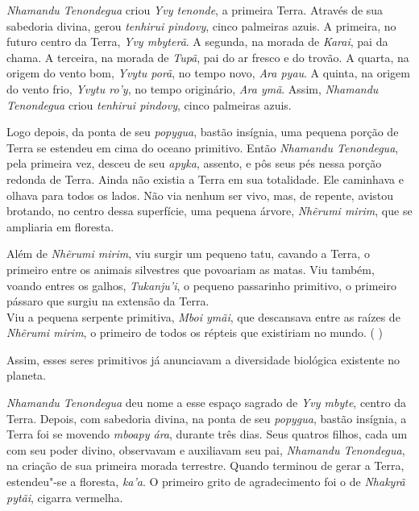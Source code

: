 

 

 



\emph{Nhamandu Tenondegua} criou \emph{Yvy tenonde}, a primeira Terra.
Através de sua sabedoria divina, gerou \emph{tenhirui pindovy}, cinco
palmeiras azuis. A primeira, no futuro centro da Terra, \emph{Yvy
mbyterã}. A segunda, na morada de \emph{Karai}, pai da chama. A terceira, na morada de \emph{Tupã}, pai do ar fresco e do trovão. A quarta, na origem do vento bom, \emph{Yvytu porã}, no tempo novo,
\emph{Ara pyau}. A quinta, na origem do vento frio, \emph{Yvytu ro'y},
no tempo originário, \emph{Ara ymã}. Assim, \emph{Nhamandu Tenondegua}
criou \emph{tenhirui pindovy}, cinco palmeiras azuis{.}

Logo depois, da ponta de seu \emph{popygua}, bastão insígnia, uma
pequena porção de Terra se estendeu em cima do oceano primitivo. Então
\emph{Nhamandu Tenondegua}, pela primeira vez, desceu de seu
\emph{apyka}, assento, e pôs seus pés nessa porção redonda de Terra.
Ainda não existia a Terra em sua totalidade. Ele caminhava e olhava para
todos os lados. Não via nenhum ser vivo, mas, de repente, avistou
brotando, no centro dessa superfície, uma pequena árvore, \emph{Nhẽrumi
mirim}, que se ampliaria em floresta.




Além de \emph{Nhẽrumi mirim}, viu surgir um pequeno tatu, cavando a
Terra, o primeiro entre os animais silvestres que povoariam as matas.
Viu também, voando entres os galhos, \emph{Tukanju'i}, o pequeno
passarinho primitivo, o primeiro pássaro que surgiu na extensão da
Terra.\\ Viu a pequena serpente primitiva, \emph{Mboi ymãi}, que
descansava entre as raízes de \emph{Nhẽrumi mirim}, o primeiro de todos
os répteis que existiriam no mundo. %
( )

 

Assim, esses seres primitivos já anunciavam a diversidade biológica
existente no planeta.



\emph{Nhamandu Tenondegua} deu nome a esse espaço sagrado de \emph{Yvy
mbyte}, centro da Terra. Depois, com sabedoria divina, na ponta de seu
\emph{popygua}, bastão insígnia, a Terra foi se movendo \emph{mboapy
ára}, durante três dias. Seus quatros filhos, cada um com seu poder
divino, observavam e auxiliavam seu pai, \emph{Nhamandu Tenondegua}, na
criação de sua primeira morada terrestre. Quando terminou de gerar a
Terra, estendeu"-se a floresta, \emph{ka'a}. O primeiro grito de
agradecimento foi o de \emph{Nhakyrã pytãi}, cigarra vermelha.

